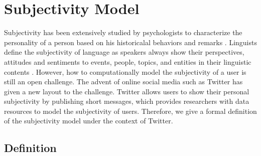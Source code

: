 \documentclass{acm_proc_article-sp}
\begin{document}
\section{Subjectivity Model}
\label{subjectivemodel}

Subjectivity has been extensively studied by psychologists to characterize the personality of a person based on his historicalal behaviors and remarks \cite{engbert2007agency}. 
Linguists define the subjectivity of language as speakers always show their perspectives, attitudes and sentiments to events, people, topics, and entities in their linguistic contents \cite{stein2005subjectivity}. 
However, how to computationally model the subjectivity of a user is still an open challenge. 
The advent of online social media such as Twitter has given a new layout to the challenge.  
Twitter allows users to show their personal subjectivity by publishing short messages, which provides researchers with data resources to model the subjectivity of users.
Therefore, we give a formal definition of the subjectivity model under the context of Twitter.

\subsection{Definition}
\label{definition}
\end{document}
